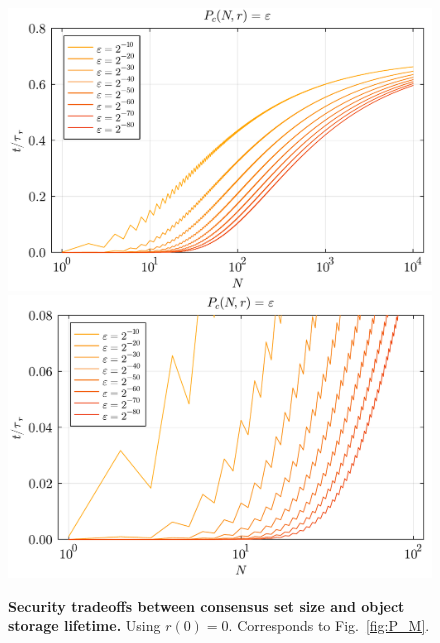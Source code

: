 \begin{figure}[!htp]
	\includegraphics[width=\columnwidth]{figs/DObS_time.pdf}\\
	\includegraphics[width=\columnwidth]{figs/DObS_time_zoom.pdf}
	\caption{\textbf{Security tradeoffs between consensus set size and object storage lifetime.} Using $r(0)=0$. Corresponds to Fig.~\ref{fig:P_M}.} \label{fig:DObS_time}
\end{figure}

